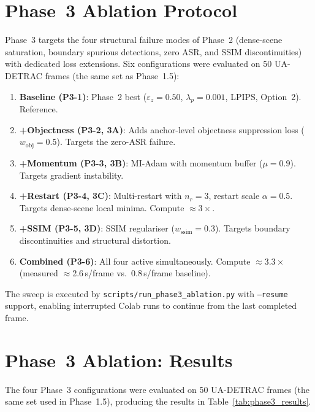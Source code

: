 \documentclass[12pt,a4paper]{report}
\begin{document}
\section{Phase~3 Ablation Protocol}
\label{sec:phase3_protocol}

Phase~3 targets the four structural failure modes of Phase~2 (dense-scene
saturation, boundary spurious detections, zero ASR, and SSIM discontinuities)
with dedicated loss extensions. Six configurations were evaluated on
50 UA-DETRAC frames (the same set as Phase~1.5):

\begin{enumerate}[label=\textbf{P3-\arabic*.}, leftmargin=*, itemsep=3pt]
  \item \textbf{Baseline (P3-1)}: Phase~2 best ($\varepsilon_z{=}0.50$, $\lambda_p{=}0.001$, LPIPS, Option~2). Reference.
  \item \textbf{+Objectness (P3-2, 3A)}: Adds anchor-level objectness suppression loss ($w_{\text{obj}}{=}0.5$). Targets the zero-ASR failure.
  \item \textbf{+Momentum (P3-3, 3B)}: MI-Adam with momentum buffer ($\mu{=}0.9$). Targets gradient instability.
  \item \textbf{+Restart (P3-4, 3C)}: Multi-restart with $n_r{=}3$, restart scale $\alpha{=}0.5$. Targets dense-scene local minima. Compute $\approx3\times$.
  \item \textbf{+SSIM (P3-5, 3D)}: SSIM regulariser ($w_{\text{ssim}}{=}0.3$). Targets boundary discontinuities and structural distortion.
  \item \textbf{Combined (P3-6)}: All four active simultaneously. Compute $\approx3.3\times$ (measured $\approx$2.6\,s/frame vs.\ 0.8\,s/frame baseline).
\end{enumerate}

The sweep is executed by \texttt{scripts/run\_phase3\_ablation.py} with
\texttt{--resume} support, enabling interrupted Colab runs to continue from
the last completed frame.

\section{Phase~3 Ablation: Results}
\label{sec:phase3_results}

The four Phase~3 configurations were evaluated on 50 UA-DETRAC frames
(the same set used in Phase~1.5), producing the results in
Table~\ref{tab:phase3_results}.
\end{document}
